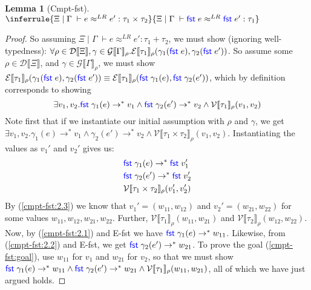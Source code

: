 \documentclass[a4paper, 11pt]{report}
\newtheorem{lemma}[theorem]{Lemma}
\theoremstyle{definition}
\newcommand{\Keyword}[1]{{\color{blue} \mathsf{#1}}}
\newcommand{\expr}{e}
\newcommand{\val}{v}
\newcommand{\valB}{w}
\newcommand{\Fst}{\Keyword{fst}\;}
\newcommand{\Tprod}[2]{#1 \times #2}
\newcommand{\Tsum}[2]{#1 + #2}
\newcommand{\typ}{\tau}
\newcommand{\venv}{\Gamma}
\newcommand{\tenv}{\Xi}
\newcommand{\jdgRel}[6]{#1 \; | \; #2 \; \vdash #3 \approx^{#4} #5 : #6}
\newcommand{\stepS}{\rightarrow^*}
\newcommand{\ValInp}[2]{\mathcal{V} \llbracket #1 \rrbracket_{#2}}
\newcommand{\ExpInp}[2]{\mathcal{E} \llbracket #1 \rrbracket_{#2}}
\newcommand{\VenvInp}[2]{\mathcal{G} \llbracket #1 \rrbracket_{#2}}
\newcommand{\TenvInp}[1]{\mathcal{D} \llbracket #1 \rrbracket}
\newcommand{\LogRel}[5]{\jdgRel{#1}{#2}{#3}{LR}{#4}{#5}}
\begin{document}
\begin{lemma}[Cmpt-fst]
  $\inferrule
  { \LogRel{\tenv}{\venv}{\expr}{\expr'}{\Tprod{\typ_1}{\typ_2}} }
  { \LogRel{\tenv}{\venv}{\Fst \expr}{\Fst \expr'}{\typ_1} }$
\end{lemma}
\begin{proof}
  So assuming $\LogRel{\tenv}{\venv}{\expr}{\expr'}{\Tsum{\typ_1}{\typ_2}}$, we must show (ignoring well-typedness): $\forall \rho \in \TenvInp{\tenv}, \gamma \in \VenvInp{\venv}{\rho} . \ExpInp{\typ_1}{\rho}(\gamma_1(\Fst \expr), \gamma_2(\Fst \expr'))$. So assume some $\rho \in \TenvInp{\tenv}$, and $\gamma \in \VenvInp{\venv}{\rho}$, we must show $\ExpInp{\typ_1}{\rho}(\gamma_1(\Fst \expr), \gamma_2(\Fst \expr')) \equiv \ExpInp{\typ_1}{\rho}(\Fst \gamma_1(\expr), \Fst \gamma_2(\expr'))$, which by definition corresponds to showing
  \begin{equation}\label{cmpt-fst:goal}
    \exists \val_1, \val_2 . \Fst \gamma_1(\expr) \stepS \val_1 \land \Fst \gamma_2(\expr') \stepS \val_2 \land \ValInp{\typ_1}{\rho}(\val_1, \val_2)
  \end{equation}
  Note first that if we instantiate our initial assumption with $\rho$ and $\gamma$, we get $\exists \val_1, \val_2 . \gamma_1(\expr) \stepS \val_1 \land \gamma_2(\expr') \stepS \val_2 \land \ValInp{\Tprod{\typ_1}{\typ_2}}{\rho}(\val_1, \val_2)$. Instantiating the values as $\val_1'$ and $\val_2'$ gives us:
  \begin{align}
    &\Fst \gamma_1(\expr) \stepS \Fst \val_1'\label{cmpt-fst:2.1}\\
    &\Fst \gamma_2(\expr') \stepS \Fst \val_2'\label{cmpt-fst:2.2}\\
    &\ValInp{\Tprod{\typ_1}{\typ_2}}{\rho}(\val_1', \val_2')\label{cmpt-fst:2.3}
  \end{align}
  By (\ref*{cmpt-fst:2.3}) we know that $\val_1' = (\valB_{11}, \valB_{12})$ and $\val_2' = (\valB_{21}, \valB_{22})$ for some values $\valB_{11}, \valB_{12}, \valB_{21}, \valB_{22}$. Further, $\ValInp{\typ_1}{\rho}(\valB_{11}, \valB_{21})$ and $\ValInp{\typ_2}{\rho}(\valB_{12}, \valB_{22})$. Now, by (\ref*{cmpt-fst:2.1}) and E-fst we have $\Fst \gamma_1(\expr) \stepS \valB_{11}$. Likewise, from (\ref*{cmpt-fst:2.2}) and E-fst, we get $\Fst \gamma_2(\expr') \stepS \valB_{21}$. To prove the goal (\ref*{cmpt-fst:goal}), use $\valB_{11}$ for $\val_1$ and $\valB_{21}$ for $\val_2$, so that we must show $ \Fst \gamma_1(\expr) \stepS \valB_{11} \land \Fst \gamma_2(\expr') \stepS \valB_{21} \land \ValInp{\typ_1}{\rho}(\valB_{11}, \valB_{21})$, all of which we have just argued holds.
\end{proof}
\end{document}
